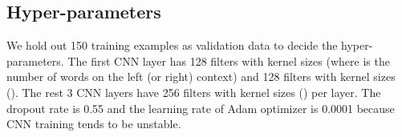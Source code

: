 \documentclass[11pt,a4paper]{article}
\begin{document}
\subsection{Hyper-parameters}
We hold out 150 training examples as validation data to decide the hyper-parameters.
The first CNN layer has 128 filters with kernel sizes  (where  is the number of words on the left (or right) context) and 128 filters with kernel sizes  ().
The rest 3 CNN layers have 256 filters with kernel sizes  () per layer.
The dropout rate is 0.55 and the learning rate of Adam optimizer \cite{kingma2014adam} is 0.0001 because CNN training tends to be unstable.

\begin{table}[t]
    \label{tab:result} 
    \centering
    \caption{Comparison results in F score: numbers in the third group are averaged scores of 5 runs. * indicates the result is statistical significant at the level of 0.05.}
\end{table}
\end{document}
